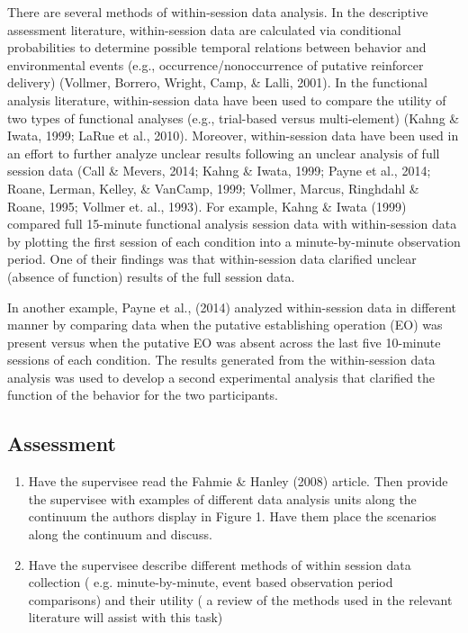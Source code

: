 There are several methods of within-session data analysis. In the descriptive assessment literature, within-session data are calculated via conditional probabilities to determine possible temporal relations between behavior and environmental events (e.g., occurrence/nonoccurrence of putative reinforcer delivery) (Vollmer, Borrero, Wright, Camp, \& Lalli, 2001). In the functional analysis literature, within-session data have been used to compare the utility of two types of functional analyses (e.g., trial-based versus multi-element) (Kahng \& Iwata, 1999; LaRue et al., 2010). Moreover, within-session data have been used in an effort to further analyze unclear results following an unclear analysis of full session data (Call \& Mevers, 2014; Kahng \& Iwata, 1999; Payne et al., 2014; Roane, Lerman, Kelley, \& VanCamp, 1999; Vollmer, Marcus, Ringhdahl \& Roane, 1995; Vollmer et. al., 1993). For example, Kahng \& Iwata (1999) compared full 15-minute functional analysis session data with within-session data by plotting the first session of each condition into a minute-by-minute observation period. One of their findings was that within-session data clarified unclear (absence of function) results of the full session data. 

In another example, Payne et al., (2014) analyzed within-session data in different manner by comparing data when the putative establishing operation (EO) was present versus when the putative EO was absent across the last five 10-minute sessions of each condition. The results generated from the within-session data analysis was used to develop a second experimental analysis that clarified the function of the behavior for the two participants.
%
\subsection{Assessment}
\begin{enumerate}
\item Have the supervisee read the Fahmie \& Hanley (2008) article. Then provide the supervisee with examples of different data analysis units along the continuum the authors display in Figure 1. Have them place the scenarios along the continuum and discuss. 
\item Have the supervisee describe different methods of within session data collection ( e.g. minute-by-minute, event based observation period comparisons) and their utility ( a review of the methods used in the relevant literature will assist with this task)
%
\end{enumerate}
%
